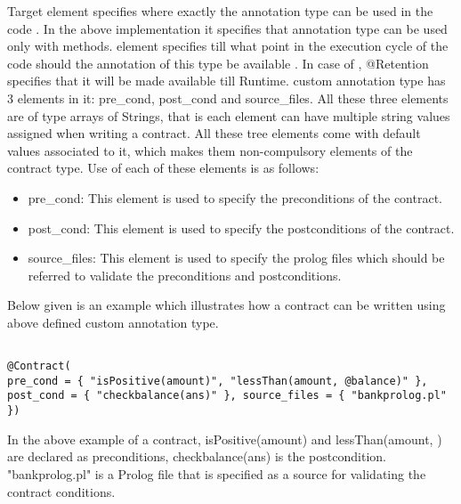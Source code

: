 Target element specifies where exactly the annotation type can be used in the code \cite{JavaAnnotationsTutorial}. In the above implementation it specifies that \@contract annotation type can be used only with methods. 
\@Retention element specifies till what point in the execution cycle of the code should the annotation of this type be available \cite{JavaAnnotationsTutorial}. In case of \@contract, @Retention specifies that it will be made available till Runtime.   
\@Contract custom annotation type has 3 elements in it: pre\_cond, post\_cond and source\_files. All these three elements are of type arrays of Strings, that is each element can have multiple string values assigned when writing a contract. All these tree elements come with default values associated to it, which makes them non-compulsory elements of the contract type. Use of each of these elements is as follows:
\begin{itemize}
\item pre\_cond: This element is used to specify the preconditions of the contract.
\item post\_cond: This element is used to specify the postconditions of the contract.
\item source\_files: This element is used to specify the prolog files which should be referred to validate the preconditions and postconditions.
\end{itemize} 

Below given is an example which illustrates how a contract can be written using above defined \@contract custom annotation type.
\linebreak


\begin{minipage}{\linewidth}
\lstset{language=Java, caption=using custom annotation to write contract, captionpos=b, breaklines=true}       
\begin{lstlisting}[frame=single]

@Contract(
pre_cond = { "isPositive(amount)", "lessThan(amount, @balance)" }, 
post_cond = { "checkbalance(ans)" }, source_files = { "bankprolog.pl" })

\end{lstlisting}
\end{minipage}

In the above example of a contract, isPositive(amount) and lessThan(amount, \@balance) are declared as preconditions, checkbalance(ans) is the postcondition. "bankprolog.pl" is a Prolog file that is specified as a source for validating the contract conditions.

